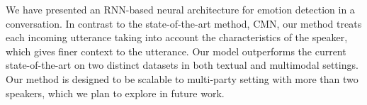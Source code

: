 \documentclass[letterpaper]{article} %
\begin{document}
We have presented an RNN-based neural architecture for emotion detection in a conversation. In contrast to the state-of-the-art method, CMN, our method treats each incoming utterance taking into account the characteristics of the speaker, which gives finer context to the utterance.
Our model outperforms the current state-of-the-art on two distinct datasets in both textual and multimodal settings. Our method is designed to be scalable to multi-party setting with more than two speakers, which we plan to explore in future work. %




\end{document}

